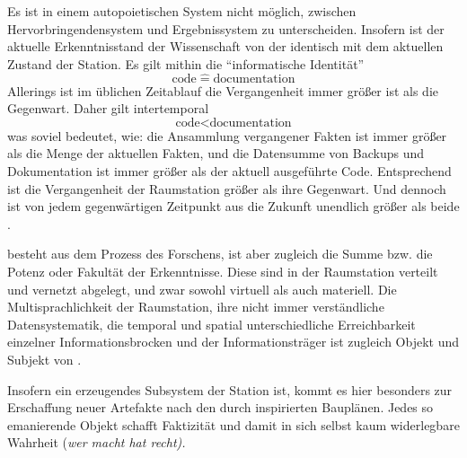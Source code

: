 \begin{newstuff}
    Es ist in einem autopoietischen System nicht möglich, zwischen Hervorbringendensystem und Ergebnissystem zu unterscheiden. Insofern ist der aktuelle Erkenntnisstand der Wissenschaft von der  identisch mit dem aktuellen Zustand der Station. Es gilt mithin die "`informatische Identität"'
    \begin{equation}
        \text{code}\;\widehat{=}\;\text{documentation}
    \end{equation}
    Allerings ist im üblichen Zeitablauf die Vergangenheit immer größer ist als die Gegenwart. Daher gilt intertemporal
    \begin{equation}
        \text{code} < \text{documentation}
    \end{equation}
    was soviel bedeutet, wie: die Ansammlung vergangener Fakten ist immer größer als die Menge der aktuellen Fakten, und die Datensumme von Backups und Dokumentation ist immer größer als der aktuell ausgeführte Code. Entsprechend ist die Vergangenheit der Raumstation größer als ihre Gegenwart. Und dennoch ist von jedem gegenwärtigen Zeitpunkt aus die Zukunft unendlich größer als beide \cite{encyclopaedia}.

     besteht aus dem Prozess des Forschens, ist aber zugleich die Summe bzw. die Potenz oder Fakultät der Erkenntnisse. Diese sind in der Raumstation verteilt und vernetzt abgelegt, und zwar sowohl virtuell als auch materiell. 
    Die Multisprachlichkeit der Raumstation, ihre nicht immer verständliche Datensystematik, die temporal und spatial unterschiedliche Erreichbarkeit einzelner Informationsbrocken und der  Informationsträger ist zugleich Objekt und Subjekt von .

    Insofern  ein erzeugendes Subsystem der Station ist, kommt es hier besonders zur Erschaffung neuer Artefakte nach den durch  inspirierten Bauplänen. Jedes so emanierende Objekt schafft Faktizität und damit in sich selbst kaum widerlegbare Wahrheit (\emph{wer macht hat recht).}
\end{newstuff}